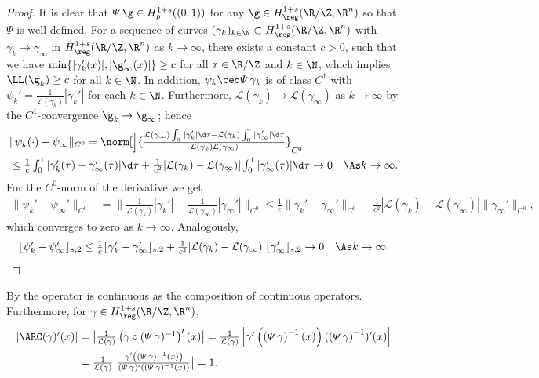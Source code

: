 	\begin{proof}
It is clear that $\varPsi \, \g \in H^{1+s}_p((0,1))$ for any 
$\g\in H^{1+s}_\reg(\R/\Z,\R^n)$ so that $\varPsi$ is well-defined.
For a sequence of curves $(\gamma_k)_{k\in\N}\subset H_\reg^{1+s}(\R/\Z,\R^n)$ 
with $\gamma_k\to\gamma_\infty$ in $H_\reg^{1+s}(\R/\Z,\R^n)$ 
as $k\to\infty$, 
there exists a constant
 $c>0$, such that we have
 $\min\{|\gamma_k'(x)|,|\g_\infty'(x)|\}\ge c$ 
 for all $x\in\R/\Z$ and $k\in\N$, which implies $\LL(\g_k)\ge c$ for
 all $k\in\N$.
 In addition, $\psi_k \ceq \varPsi \, \gamma_k$ is of class  
 $C^1$ with $\psi_k'=\frac{1}{\mathcal{L}(\gamma_k)}\left|\gamma_k' \right|$
 for each $k\in\N$. 
Furthermore,  
$\mathcal{L}(\gamma_k)\to\mathcal{L}(\gamma_\infty)$ as $k\to\infty$
by the $C^1$-convergence $\g_k\to\g_\infty$; hence
\begin{align*}
&
\textstyle
\|\psi_k(\cdot)-\psi_\infty\|_{C^0}
= \norm[\Big]{ 
	\frac{\mathcal{L}(\gamma_\infty)\int_{0}^{\cdot}|\gamma_k'|\d\tau
	-\mathcal{L}(\gamma_k)\int_{0}^{\cdot}|\gamma_\infty'|\d\tau}{\mathcal{L}(
	\gamma_k)\mathcal{L}(\gamma_\infty)} 
}_{C^0}\\
&
\textstyle
\le\frac{1}{c}\int_{0}^{1}|\gamma_k'(\tau)-\gamma_\infty'(\tau)|\d\tau 
+ \frac{1}{c^2}| \mathcal{L}(\gamma_k)-\mathcal{L}(\gamma_\infty)|
\int_{0}^{1}|\gamma_\infty'(\tau)|\d\tau\to 0\quad\As k\to\infty.
\end{align*}
For the $C^0$-norm of the derivative we get
\begin{align*}
\textstyle
\|\psi_k'-\psi_\infty'\|_{C^0}&
\textstyle
=\big\|\frac{1}{\mathcal{L}(\gamma_k)}
|\gamma_k'| -\frac{1}{\mathcal{L}(\gamma_\infty)}|\gamma_\infty'|\big\|_{C^0}
\textstyle
\le\frac{1}{c}\|\gamma_k'-\gamma_\infty'\|_{C^0}
+\frac{1}{c^2}|\mathcal{L}(\gamma_k)-\mathcal{L}(\gamma_\infty)|
\|\gamma_\infty'\|_{C^0},
\end{align*}
which converges to zero as $k\to\infty$. Analogously,
\begin{align*}
\textstyle
\lfloor\psi_k'-\psi_\infty'\rfloor_{s,2}\le\frac{1}{c} 
\lfloor\gamma_k'-\gamma_\infty'\rfloor_{s,2}+\frac{1}{c^2}
|\mathcal{L}(\gamma_k)-\mathcal{L}(\gamma_\infty)|\lfloor\gamma_\infty'
\rfloor_{s,2}\to 0\quad\As k\to\infty. 
\end{align*}
	\end{proof}
\begin{refproof}
By 
the operator is continuous as the composition of continuous operators. 
Furthermore, for $\gamma\in H^{1+s}_\reg(\R/\Z,\R^n)$, 
\begin{align*}
\textstyle
|\ARC(\gamma)'(x)|&
\textstyle
=\big|\frac{1}{\mathcal{L}(\gamma)}
\left( \gamma\circ(\varPsi \, \gamma)^{-1}\right)'(x) \big|
=\frac{1}{\mathcal{L}(\gamma)}\left|\gamma'\left( \left( \varPsi \, \gamma \right)^{-1} (x)\right)(\left( \varPsi \, \gamma \right)^{-1})'(x) \right|\\
&
\textstyle
=\frac{1}{\mathcal{L}(\gamma)}\big|\frac{\gamma'\left( (\varPsi \, \gamma)^{-1}(x) \right)}{(\varPsi \, \gamma)'((\varPsi \, \gamma)^{-1}(x))} \big|=1.
\end{align*}
\end{refproof}

